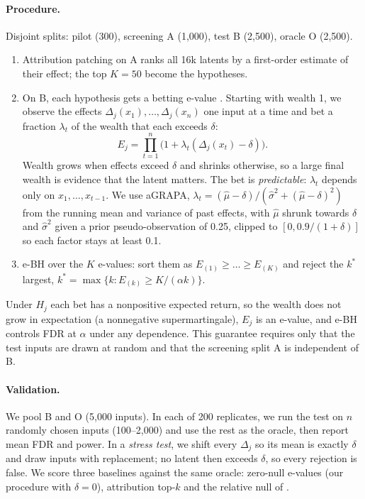\paragraph{Procedure.} Disjoint splits: pilot (300), screening A (1,000), test B (2,500), oracle O
(2,500).
\begin{enumerate}[leftmargin=*,itemsep=1pt,topsep=2pt]
  \item Attribution patching on A ranks all 16k latents by a first-order estimate of their effect; the top
        $K = 50$ become the hypotheses.
  \item On B, each hypothesis gets a betting e-value \citep{waudbysmith2024betting}. Starting with wealth 1,
        we observe the effects $\Delta_j(x_1), \dots, \Delta_j(x_n)$ one input at a time and bet a fraction
        $\lambda_t$ of the wealth that each exceeds $\delta$:
        \begin{equation}
        E_j = \prod_{t=1}^{n} \bigl(1 + \lambda_t(\Delta_j(x_t) - \delta)\bigr).
        \end{equation}
        Wealth grows when effects exceed $\delta$ and shrinks otherwise, so a large final wealth is evidence that the latent matters.
        The bet is \emph{predictable}: $\lambda_t$ depends only on $x_1, \dots, x_{t-1}$. We use aGRAPA,
        $\lambda_t = (\hat\mu - \delta)/(\hat\sigma^2 + (\hat\mu - \delta)^2)$ from the running mean and variance of past
        effects, with $\hat\mu$ shrunk towards $\delta$ and $\hat\sigma^2$ given a prior pseudo-observation of 0.25, clipped
        to $[0, 0.9/(1+\delta)]$ so each factor stays at least 0.1.
  \item e-BH \citep{wang2022evalues} over the $K$ e-values: sort them as $E_{(1)} \ge \dots \ge E_{(K)}$
        and reject the $k^*$ largest, $k^* = \max\{k : E_{(k)} \ge K/(\alpha
        k)\}$.
\end{enumerate}
Under $H_j$ each bet has a nonpositive expected return, so the wealth does not grow in expectation (a nonnegative supermartingale), $E_j$ is an e-value, and e-BH controls FDR at $\alpha$ under any dependence. This guarantee requires only that the test inputs are drawn at random and that the screening split A is independent of B.

\paragraph{Validation.} We pool B and O (5,000 inputs). In each of 200 replicates, we run the test on $n$ randomly chosen inputs (100--2,000) and use the rest as the oracle, then report mean FDR and power. In a \emph{stress test}, we shift every $\Delta_j$ so its mean is exactly $\delta$ and draw inputs with replacement; no latent then exceeds $\delta$, so every rejection is false. We score three baselines against the same oracle: zero-null e-values (our procedure with $\delta = 0$), attribution top-$k$ \citep{marks2025sparse} and the relative null of \citet{khera2026}.

